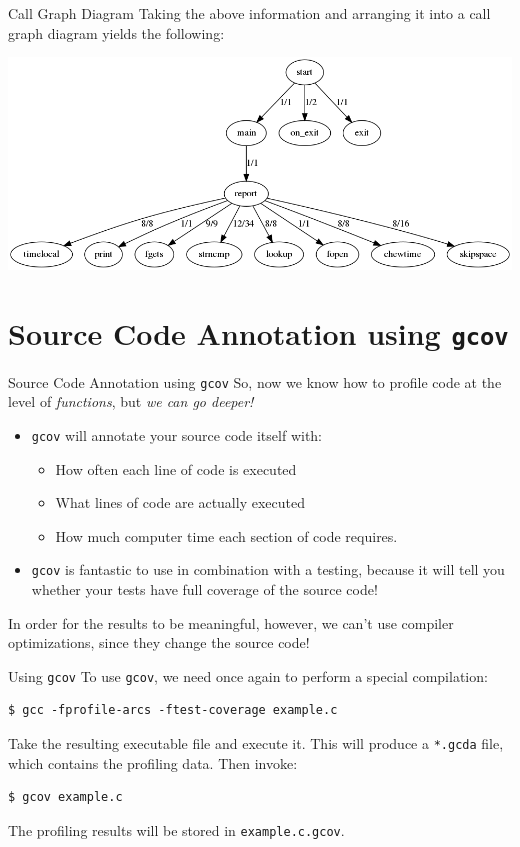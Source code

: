 \documentclass[11pt]{beamer}
\begin{document}
\begin{frame}{Call Graph Diagram}
Taking the above information and arranging it into a call graph diagram yields the following:

\center
\includegraphics[scale=0.33]{graphs/callgraph.png}
\end{frame}

\section[gcov]{Source Code Annotation using \texttt{gcov}}
\begin{frame}{Source Code Annotation using \texttt{gcov}}
So, now we know how to profile code at the level of \emph{functions}, but \emph{we can go deeper!}
\begin{itemize}
\item \texttt{gcov} will annotate your source code itself with: 
\begin{itemize}
\item How often each line of code is executed
\item What lines of code are actually executed
\item How much computer time each section of code requires.
\end{itemize}
\item \texttt{gcov} is fantastic to use in combination with a testing, because it will tell you whether your tests have full coverage of the source code!
\end{itemize}
In order for the results to be meaningful, however, we can't use compiler optimizations, since they change the source code!
\end{frame}

\begin{frame}[fragile=singleslide]{Using \texttt{gcov}}
To use \texttt{gcov}, we need once again to perform a special compilation:
\begin{lstlisting}[style=terminal]
$ gcc -fprofile-arcs -ftest-coverage example.c
\end{lstlisting}
Take the resulting executable file and execute it.  This will produce a \texttt{*.gcda} file, which contains the profiling data. Then invoke:
\begin{lstlisting}[style=terminal]
$ gcov example.c
\end{lstlisting}
The profiling results will be stored in \texttt{example.c.gcov}.
\end{frame}
\end{document}
